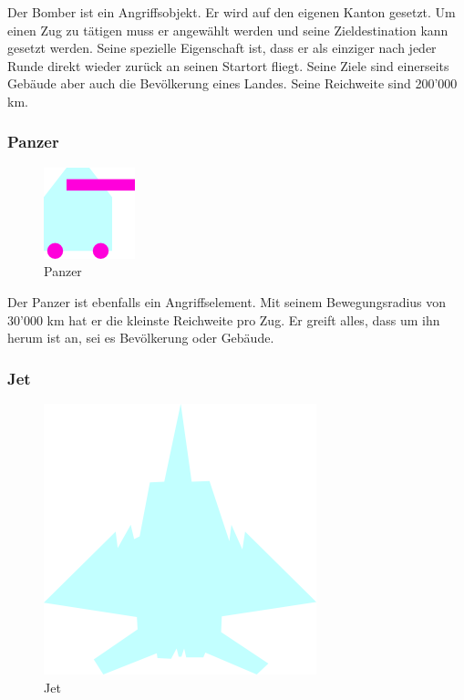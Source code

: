 \documentclass[ngerman, 12pt, pdftex]{scrartcl}[2006/07/30]
\begin{document}
Der Bomber ist ein Angriffsobjekt.
Er wird auf den eigenen Kanton gesetzt. Um einen Zug zu tätigen muss er angewählt werden und seine Zieldestination kann gesetzt werden. Seine spezielle Eigenschaft ist, dass er als einziger nach jeder Runde direkt wieder zurück an seinen Startort fliegt.
Seine Ziele sind einerseits Gebäude aber auch die Bevölkerung eines Landes. Seine Reichweite sind 200'000 km.

\subsubsection{Panzer}

\begin{figure}[h]
\centering
\includegraphics[scale=1.8]{spiel/Panzer.png}
\caption{Panzer}
\end{figure}

Der Panzer ist ebenfalls ein Angriffselement.
Mit seinem Bewegungsradius von 30'000 km hat er die kleinste Reichweite pro Zug. Er greift alles, dass um ihn herum ist an, sei es Bevölkerung oder Gebäude. 

\newpage

\subsubsection{Jet}

\begin{figure}[h]
\centering
\includegraphics[scale=1.8]{spiel/Flugzeug.png}
\caption{Jet}
\end{figure}
\end{document}
